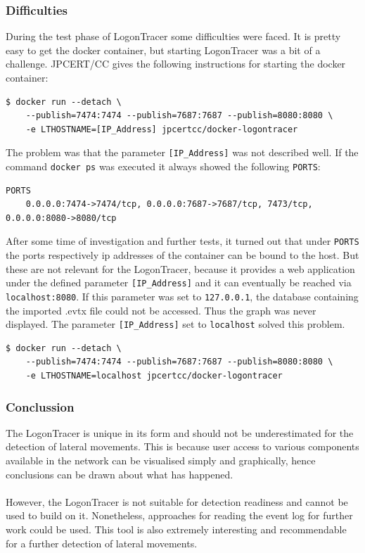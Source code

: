 \subsubsection{Difficulties}
During the test phase of LogonTracer some difficulties were faced. It is pretty easy to get the docker container, but starting LogonTracer was a bit of a challenge. JPCERT/CC gives the following instructions for starting the docker container:
\begin{lstlisting}[language=HTML,caption=LogonTracer: given docker run command]
    $ docker run --detach \
    --publish=7474:7474 --publish=7687:7687 --publish=8080:8080 \
    -e LTHOSTNAME=[IP_Address] jpcertcc/docker-logontracer
\end{lstlisting}
The problem was that the parameter \lstinline|[IP_Address]| was not described well. If the command \lstinline|docker ps| was executed it always showed the following \lstinline|PORTS|:
\begin{lstlisting}[caption=LogonTracer: docker ps (PORTS)]
    PORTS
    0.0.0.0:7474->7474/tcp, 0.0.0.0:7687->7687/tcp, 7473/tcp, 0.0.0.0:8080->8080/tcp
\end{lstlisting}
After some time of investigation and further tests, it turned out that under \lstinline|PORTS| the ports respectively ip addresses of the container can be bound to the host. But these are not relevant for the LogonTracer, because it provides a web application under the defined parameter \lstinline|[IP_Address]| and it can eventually be reached via \lstinline|localhost:8080|. If this parameter was set to \lstinline|127.0.0.1|, the database containing the imported .evtx file could not be accessed. Thus the graph was never displayed. The parameter \lstinline|[IP_Address]| set to \lstinline|localhost| solved this problem.

\begin{lstlisting}[language=HTML,caption=LogonTracer: recommended docker run command]
    $ docker run --detach \
    --publish=7474:7474 --publish=7687:7687 --publish=8080:8080 \
    -e LTHOSTNAME=localhost jpcertcc/docker-logontracer
\end{lstlisting}
\subsubsection{Conclussion}
The LogonTracer is unique in its form and should not be underestimated for the detection of lateral movements. This is because user access to various components available in the network can be visualised simply and graphically, hence conclusions can be drawn about what has happened.
\\\\
However, the LogonTracer is not suitable for detection readiness and cannot be used to build on it. Nonetheless, approaches for reading the event log for further work could be used. This tool is also extremely interesting and recommendable for a further detection of lateral movements.

